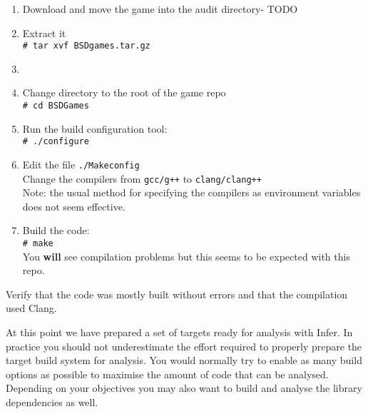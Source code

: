\begin{enumerate}
	\itemsep0em
	\item Download and move the game into the audit directory- TODO 
	\item Extract it\\
	\verb|# tar xvf BSDgames.tar.gz|
	\item {}
	\item Change directory to the root of the game repo	\\
	\verb|# cd BSDGames|	
	\item Run the build configuration tool:\\
	\verb|# ./configure|
	\item Edit the file \verb|./Makeconfig|\\
	Change the compilers from \verb|gcc/g++| to \verb|clang/clang++|\\
	Note: the usual method for specifying the compilers as environment variables does not seem effective.
	\item Build the code:\\
	\verb|# make |\\
	You \textbf{will} see compilation problems but this seems to be expected with this repo.
\end{enumerate}

Verify that the code was mostly built without errors and that the compilation used Clang.

\vspace{1cm}

At this point we have prepared a set of targets ready for analysis with Infer.
In practice you should not underestimate the effort required to properly prepare
the target build system for analysis. 
You would normally try to enable as many build options
as possible to maximise the amount of code that can be analysed. 
Depending on your objectives you may also want to build and analyse the library dependencies as well.

